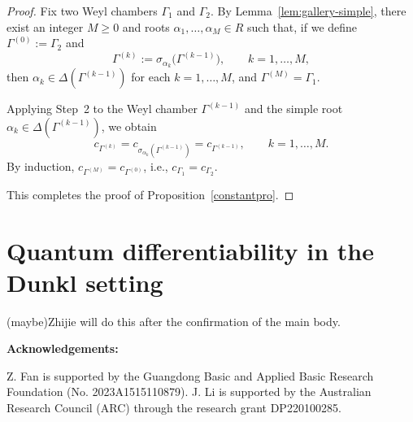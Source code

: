 \documentclass[12pt]{amsart}
\begin{document}
\begin{proof}
Fix two Weyl chambers $\Gamma_1$ and $\Gamma_2$. By Lemma~\ref{lem:gallery-simple}, there exist an integer $M\ge0$
and roots $\alpha_1,\dots,\alpha_M\in R$ such that, if we define $\Gamma^{(0)}:=\Gamma_2$ and
\[
\Gamma^{(k)}:=\sigma_{\alpha_k}\big(\Gamma^{(k-1)}\big),\qquad k=1,\dots,M,
\]
then $\alpha_k\in\Delta(\Gamma^{(k-1)})$ for each $k=1,\dots,M$, and $\Gamma^{(M)}=\Gamma_1$.

Applying Step~2 to the Weyl chamber $\Gamma^{(k-1)}$ and the simple root $\alpha_k\in\Delta(\Gamma^{(k-1)})$,
we obtain
\[
c_{\Gamma^{(k)}}=c_{\sigma_{\alpha_k}(\Gamma^{(k-1)})}=c_{\Gamma^{(k-1)}},\qquad k=1,\dots,M.
\]
By induction, $c_{\Gamma^{(M)}}=c_{\Gamma^{(0)}}$, i.e., $c_{\Gamma_1}=c_{\Gamma_2}$.

This completes the proof of Proposition~\ref{constantpro}.
\end{proof}

\section{Quantum differentiability in the Dunkl setting}
{\color{red}(maybe)Zhijie will do this after the confirmation of the main body.}

\bigskip

 \noindent
 {\bf Acknowledgements:}

Z. Fan is supported by the Guangdong Basic and Applied Basic Research Foundation (No. 2023A1515110879). J. Li is supported by the Australian Research Council (ARC) through the research grant DP220100285.



\end{document}
